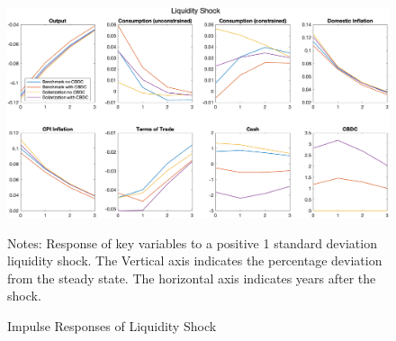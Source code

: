\documentclass[12pt]{article}
\begin{document}
\begin{figure}[h!]
\includegraphics[width=\textwidth]{Liquidity}
\label{IRF3}
\caption{Impulse Responses of Liquidity Shock}
\scriptsize{Notes: Response of key variables to a positive 1 standard deviation liquidity shock. The Vertical axis indicates the percentage deviation from the steady state. The horizontal axis indicates years after the shock.}
\end{figure}
\end{document}
